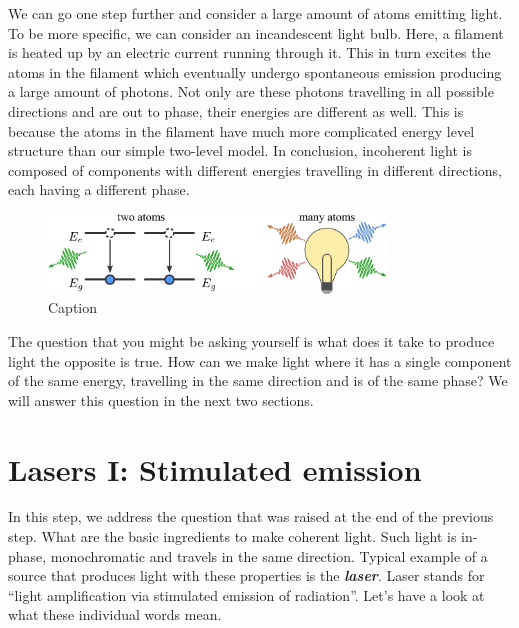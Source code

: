 We can go one step further and consider a large amount of atoms emitting light.
To be more specific, we can consider an incandescent light bulb.
Here, a filament is heated up by an electric current running through it.
This in turn excites the atoms in the filament which eventually undergo spontaneous emission producing a large amount of photons.
Not only are these photons travelling in all possible directions and are out to phase, their energies are different as well.
This is because the atoms in the filament have much more complicated energy level structure than our simple two-level model.
In conclusion, incoherent light is composed of components with different energies travelling in different directions, each having a different phase.

\begin{figure}
    \centering
    \includegraphics[width=0.8\textwidth]{lesson5/5-2_incoherent_emission.pdf}
    \caption[Incoherent emission]{Caption}
    \label{fig:5-2_incoherent_emission}
\end{figure}

The question that you might be asking yourself is what does it take to produce light the opposite is true.
How can we make light where it has a single component of the same energy, travelling in the same direction and is of the same phase?
We will answer this question in the next two sections.



\section{Lasers I: Stimulated emission}
\label{sec:5-3_lasers1}


In this step, we address the question that was raised at the end of the previous step.
What are the basic ingredients to make coherent light.
Such light is in-phase, monochromatic and travels in the same direction.
Typical example of a source that produces light with these properties is the \textit{\textbf{laser}}.
Laser stands for ``light amplification via stimulated emission of radiation''.
Let's have a look at what these individual words mean.

